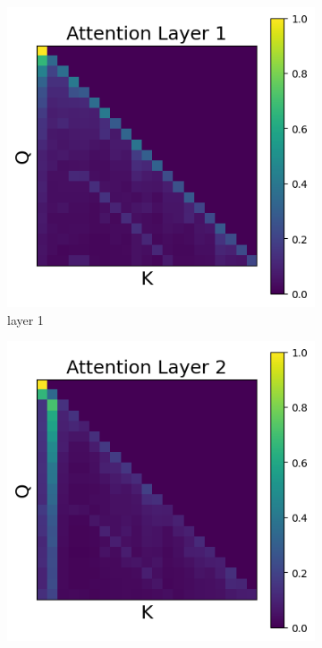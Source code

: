 \documentclass[11pt]{article}
\begin{document}
\subsection{}\label{app:intervention3}
\begin{figure}[t]
  \begin{subfigure}[t]{0.24\textwidth}
    \centering
    \includegraphics[width=1.4\columnwidth]{figures/intervention3/layer_1.png}
    \caption{layer 1}
  \end{subfigure}\hfill
  \begin{subfigure}[t]{0.24\textwidth}
    \centering
    \includegraphics[width=1.4\columnwidth]{figures/intervention3/layer_2.png}

\end{subfigure}
\end{figure}
\end{document}
